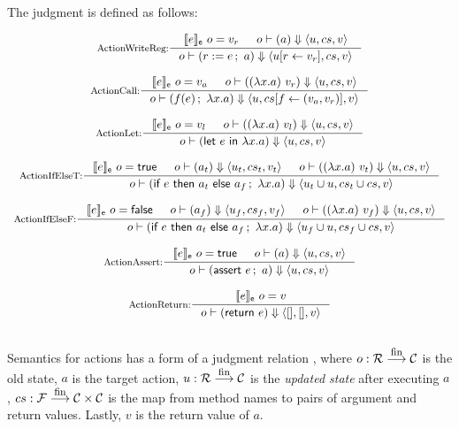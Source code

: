 \begin{definition}
  \label{def-semaction}
  The judgment  is defined as follows:
  \begin{center}
    \begin{math}
      \begin{array}{c}
        \inference[ActionWriteReg:]{\semexpr{e}{o} = v_r & \semact{o}{a}{u}{cs}{v}}
                  {\semact{o}{\actwrite{r}{e}{a}}{\stupd{u}{r}{v_r}}{cs}{v}} \\
        \mbox{} \\
        \inference[ActionCall:]{\semexpr{e}{o} = v_a & \semact{o}{(\lambda x.a)\ v_r}{u}{cs}{v}}
                  {\semact{o}{\actcall{x}{f}{e}{a}}{u}{\lblupd{cs}{f}{(v_a, v_r)}}{v}} \\
        \mbox{} \\
        \inference[ActionLet:]{\semexpr{e}{o} = v_l & \semact{o}{(\lambda x.a)\ v_l}{u}{cs}{v}}
                  {\semact{o}{\actlet{e}{x}{a}}{u}{cs}{v}} \\
        \mbox{} \\
        \inference[ActionIfElseT:]{\semexpr{e}{o} = \btrue{} &
          \semact{o}{a_t}{u_t}{cs_t}{v_t} &
          \semact{o}{(\lambda x.a)\ v_t}{u}{cs}{v}}
                  {\semact{o}{\actifelse{e}{a_t}{a_f}{x}{a}}{\sunion{u_t}{u}}{\sunion{cs_t}{cs}}{v}} \\
        \mbox{} \\
        \inference[ActionIfElseF:]{\semexpr{e}{o} = \bfalse{} &
          \semact{o}{a_f}{u_f}{cs_f}{v_f} &
          \semact{o}{(\lambda x.a)\ v_f}{u}{cs}{v}}
                  {\semact{o}{\actifelse{e}{a_t}{a_f}{x}{a}}{\sunion{u_f}{u}}{\sunion{cs_f}{cs}}{v}} \\
        \mbox{} \\
        \inference[ActionAssert:]{\semexpr{e}{o} = \btrue{} & \semact{o}{a}{u}{cs}{v}}
                  {\semact{o}{\actassert{e}{a}}{u}{cs}{v}} \\
        \mbox{} \\
        \inference[ActionReturn:]{\semexpr{e}{o} = v}
                  {\semact{o}{\actret{e}}{\emptymap{}}{\emptymap{}}{v}} \\
        \mbox{} \\
      \end{array}
    \end{math}
  \end{center}
\end{definition}

Semantics for actions has a form of a judgment relation
, where $o : \mathcal{R} \stackrel{\textrm{\footnotesize{fin}}}{\longrightarrow} \mathcal{C}{}$ is the old state, $a$
is the target action, $u : \mathcal{R} \stackrel{\textrm{\footnotesize{fin}}}{\longrightarrow} \mathcal{C}{}$ is the \emph{updated state}
after executing $a$, $cs : \mathcal{F} \stackrel{\textrm{\footnotesize{fin}}}{\longrightarrow} \mathcal{C} \times \mathcal{C}{}$ is the map from method names to
pairs of argument and return values. Lastly, $v$ is the return value
of $a$.

